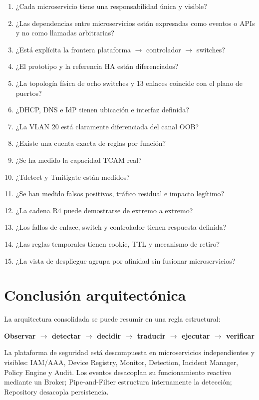 \documentclass[11pt,a4paper]{article}
\begin{document}
\begin{enumerate}[label=\arabic*.]
\item ¿Cada microservicio tiene una responsabilidad única y visible?
\item ¿Las dependencias entre microservicios están expresadas como eventos o APIs y no como llamadas arbitrarias?
\item ¿Está explícita la frontera plataforma \(\rightarrow\) controlador \(\rightarrow\) switches?
\item ¿El prototipo y la referencia HA están diferenciados?
\item ¿La topología física de ocho switches y 13 enlaces coincide con el plano de puertos?
\item ¿DHCP, DNS e IdP tienen ubicación e interfaz definida?
\item ¿La VLAN 20 está claramente diferenciada del canal OOB?
\item ¿Existe una cuenta exacta de reglas por función?
\item ¿Se ha medido la capacidad TCAM real?
\item ¿Tdetect y Tmitigate están medidos?
\item ¿Se han medido falsos positivos, tráfico residual e impacto legítimo?
\item ¿La cadena R4 puede demostrarse de extremo a extremo?
\item ¿Los fallos de enlace, switch y controlador tienen respuesta definida?
\item ¿Las reglas temporales tienen cookie, TTL y mecanismo de retiro?
\item ¿La vista de despliegue agrupa por afinidad sin fusionar microservicios?
\end{enumerate}

\section{Conclusión arquitectónica}

La arquitectura consolidada se puede resumir en una regla estructural:

\begin{center}
\Large\bfseries
Observar \(\rightarrow\) detectar \(\rightarrow\) decidir \(\rightarrow\) traducir \(\rightarrow\) ejecutar \(\rightarrow\) verificar
\end{center}

La plataforma de seguridad está descompuesta en microservicios independientes y visibles: IAM/AAA, Device Registry, Monitor, Detection, Incident Manager, Policy Engine y Audit. Los eventos desacoplan su funcionamiento reactivo mediante un Broker; Pipe-and-Filter estructura internamente la detección; Repository desacopla persistencia.
\end{document}
